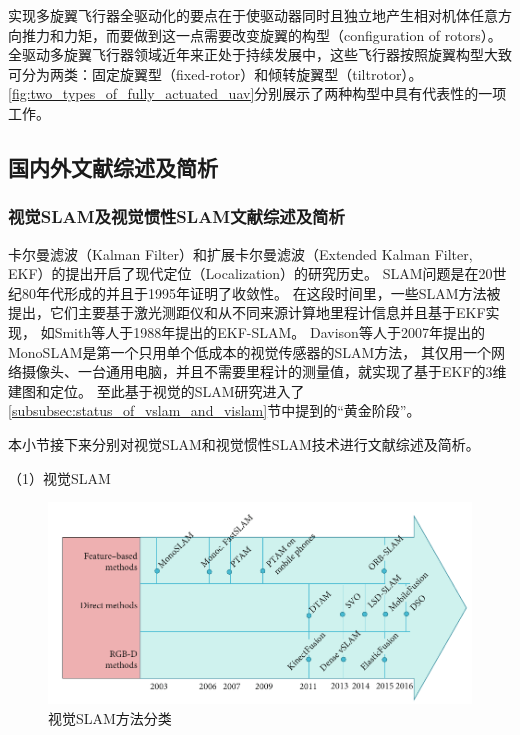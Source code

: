 实现多旋翼飞行器全驱动化的要点在于使驱动器同时且独立地产生相对机体任意方向推力和力矩，而要做到这一点需要改变旋翼的构型（configuration of rotors）。
全驱动多旋翼飞行器领域近年来正处于持续发展中，这些飞行器按照旋翼构型大致可分为两类：固定旋翼型（fixed-rotor）\cite{brescianini2016design, park2018odar,allenspach2020design}和倾转旋翼型（tiltrotor）\cite{ryll2014novel, kamel2018voliro}。
\ref{fig:two_types_of_fully_actuated_uav}分别展示了两种构型中具有代表性的一项工作。

\subsection{国内外文献综述及简析}
\subsubsection{视觉SLAM及视觉惯性SLAM文献综述及简析}
卡尔曼滤波（Kalman Filter）\cite{kalman1960new}和扩展卡尔曼滤波（Extended Kalman Filter, EKF）\cite{maybeck1982stochastic}的提出开启了现代定位（Localization）的研究历史。
SLAM问题是在20世纪80年代形成的并且于1995年证明了收敛性\cite{durrant1988uncertain,leonard1991simultaneous,smith1986representation}。
在这段时间里，一些SLAM方法被提出，它们主要基于激光测距仪和从不同来源计算地里程计信息并且基于EKF实现，
如Smith等人于1988年提出的EKF-SLAM\cite{cheeseman1987stochastic}。
Davison等人于2007年提出的MonoSLAM\cite{davison2007monoslam}是第一个只用单个低成本的视觉传感器的SLAM方法，
其仅用一个网络摄像头、一台通用电脑，并且不需要里程计的测量值，就实现了基于EKF的3维建图和定位。
至此基于视觉的SLAM研究进入了\ref{subsubsec:status_of_vslam_and_vislam}节中提到的“黄金阶段”。

本小节接下来分别对视觉SLAM和视觉惯性SLAM技术进行文献综述及简析。

（1）视觉SLAM

\begin{figure}[htbp]
    \centering
    \includegraphics[width = \textwidth]{figures/vslam_classification.png}
    \caption{视觉SLAM方法分类\cite{servieres2021visual}}
    \label{fig:vslam_classification}
\end{figure}

